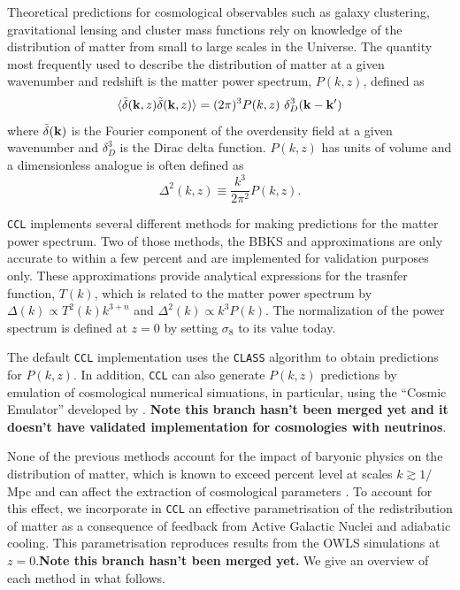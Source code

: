 \documentclass[\docopts]{\docclass}
\newcommand{\ccl}{{\tt CCL}\xspace}
\begin{document}
Theoretical predictions for cosmological observables such as galaxy clustering, gravitational lensing and cluster mass functions rely on knowledge of the distribution of matter from small to large scales in the Universe. The quantity most frequently used to describe the distribution of matter at a given wavenumber and redshift is the matter power spectrum, $P(k,z)$, defined as
\begin{equation}
  \langle \tilde\delta({\bf k},z)\tilde\delta({\bf k},z)\rangle = (2\pi)^3P(k,z)\
\delta_D^3({\bf k}-{\bf k}')
\end{equation}
where $\tilde\delta({\bf k})$ is the Fourier component of the overdensity field at a given wavenumber and $\delta_D^3$ is the Dirac delta function. $P(k,z)$ has units of volume and a dimensionless analogue is often defined as
\begin{equation}
  \Delta^2(k,z) \equiv \frac{k^3}{2\pi^2}P(k,z).
\end{equation}

\ccl implements several different methods for making predictions for the matter power spectrum. Two of those methods, the BBKS \citep{BBKS} and \citet{1998ApJ...496..605E} approximations are only accurate to within a few percent and are implemented for validation purposes only. These approximations provide analytical expressions for the trasnfer function, $T(k)$, which is related to the matter power spectrum by $\Delta(k)\propto T^2(k)k^{3+n}$ and $\Delta^2(k)\propto k^3P(k)$. The normalization of the power spectrum is defined at $z=0$ by setting $\sigma_8$ to its value today.

The default \ccl implementation uses the {\tt CLASS} algorithm \citet{class} to obtain predictions for $P(k,z)$. In addition, \ccl can also generate $P(k,z)$ predictions by emulation of cosmological numerical simuations, in particular, using the ``Cosmic Emulator'' developed by \citet{Lawrence17}. {\bf Note this branch hasn't been merged yet and it doesn't have validated implementation for cosmologies with neutrinos}.

None of the previous methods account for the impact of baryonic physics on the distribution of matter, which is known to exceed percent level at scales $k \gtrsim 1/$Mpc \citep{vanDaalen11,Illustris,Hellwing16,Springel17} and can affect the extraction of cosmological parameters \citep{Semboloni11,Semboloni13,Mohammed14,Eifler15,Mohammed17}. To account for this effect, we incorporate in \ccl an effective parametrisation \citep{Schneider15} of the redistribution of matter as a consequence of feedback from Active Galactic Nuclei and adiabatic cooling. This parametrisation reproduces results from the OWLS simulations at $z=0$.{\bf Note this branch hasn't been merged yet.} We give an overview of each method in what follows.
\end{document}
